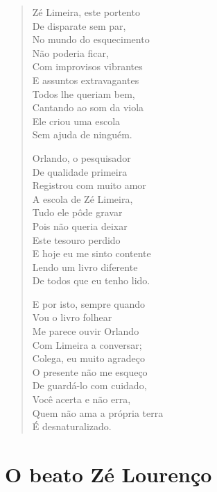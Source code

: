 \begin{verse}
Zé Limeira, este portento\\
De disparate sem par,\\
No mundo do esquecimento\\
Não poderia ficar,\\
Com improvisos vibrantes\\
E assuntos extravagantes\\
Todos lhe queriam bem,\\
Cantando ao som da viola\\
Ele criou uma escola\\
Sem ajuda de ninguém.

Orlando, o pesquisador\\
De qualidade primeira\\
Registrou com muito amor\\
A escola de Zé Limeira,\\
Tudo ele pôde gravar\\
Pois não queria deixar\\
Este tesouro perdido\\
E hoje eu me sinto contente\\
Lendo um livro diferente\\
De todos que eu tenho lido.

E por isto, sempre quando\\
Vou o livro folhear\\
Me parece ouvir Orlando\\
Com Limeira a conversar;\\
Colega, eu muito agradeço\\
O presente não me esqueço\\
De guardá-lo com cuidado,\\
Você acerta e não erra,\\
Quem não ama a própria terra\\
É desnaturalizado.
\end{verse}

\chapter{O beato Zé Lourenço}

